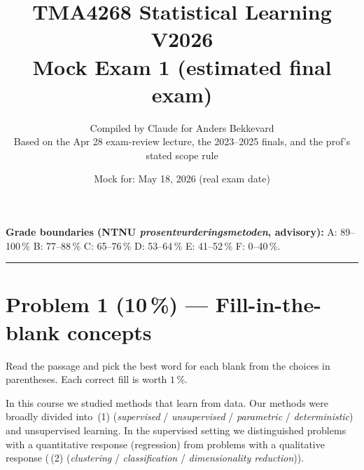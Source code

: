 \documentclass[11pt,a4paper]{article}
\title{TMA4268 Statistical Learning V2026\\[0.3em]
\large Mock Exam 1 (estimated final exam)}
\author{Compiled by Claude for Anders Bekkevard\\[0.2em]
\small Based on the Apr 28 exam-review lecture, the 2023--2025 finals, and the prof's stated scope rule}
\date{Mock for: May 18, 2026 (real exam date)}
\newcommand{\points}[1]{\textbf{(#1\,\%)}}
\begin{document}
\maketitle

\noindent{}

\vspace{0.6em}
\noindent\textbf{Grade boundaries (NTNU \emph{prosentvurderingsmetoden}, advisory):}
A: 89--100\,\% \quad B: 77--88\,\% \quad C: 65--76\,\% \quad D: 53--64\,\% \quad E: 41--52\,\% \quad F: 0--40\,\%.

\vspace{1em}
\hrule
\vspace{1em}

\section*{Problem 1 \points{10} --- Fill-in-the-blank concepts}

\noindent Read the passage and pick the best word for each blank from the choices in parentheses. Each correct fill is worth $1$\,\%.

\bigskip

In this course we studied methods that learn from data. Our methods were broadly divided into \underline{\hspace{2cm}}\,(1) (\emph{supervised} / \emph{unsupervised} / \emph{parametric} / \emph{deterministic}) and unsupervised learning. In the supervised setting we distinguished problems with a quantitative response (regression) from problems with a qualitative response (\underline{\hspace{2cm}}\,(2) (\emph{clustering} / \emph{classification} / \emph{dimensionality reduction})).
\end{document}
